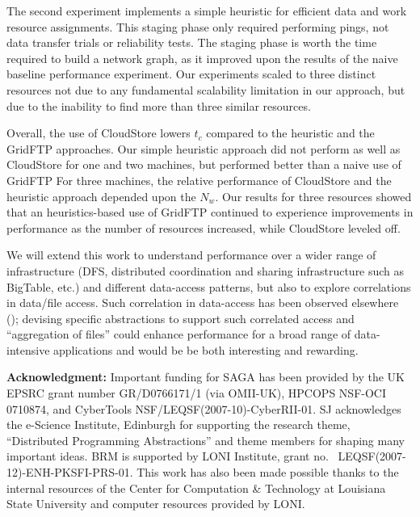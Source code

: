 \documentclass{rspublic}
\begin{document}
The second experiment implements a simple heuristic for efficient data
and work resource assignments. This staging phase only required
performing pings, not data transfer trials or reliability tests. The
staging phase is worth the time required to build a network graph, as
it improved upon the results of the naive baseline performance
experiment. Our experiments scaled to three distinct resources not due
to any fundamental scalability limitation in our approach, but due to
the inability to find more than three similar resources.
 
Overall, the use of CloudStore lowers $t_c$ compared to the
heuristic and the GridFTP approaches. Our simple heuristic 
approach did not perform as well as CloudStore for one and two
machines, but performed better than a naive use of GridFTP For three
machines, the relative performance of CloudStore and the heuristic
approach depended upon the $N_w$. Our results for three resources
showed that an heuristics-based use of GridFTP continued to experience
improvements in performance as the number of resources increased, while
CloudStore leveled off. 

We will extend this work to understand performance over a wider range
of infrastructure (DFS, distributed coordination and sharing
infrastructure such as BigTable, etc.) and different data-access
patterns, but also to explore correlations in data/file access. Such
correlation in data-access has been observed elsewhere
(\cite{filecule}); devising specific abstractions to support such
correlated access and ``aggregation of files'' could enhance
performance for a broad range of data-intensive applications and would
be be both interesting and rewarding.

{\bf Acknowledgment:} Important funding for SAGA has been provided by
the UK EPSRC grant number GR/D0766171/1 (via OMII-UK), HPCOPS
NSF-OCI 0710874, and CyberTools NSF/LEQSF(2007-10)-CyberRII-01.
 SJ acknowledges the e-Science Institute, Edinburgh
for supporting the research theme, ``Distributed Programming
Abstractions'' and theme members for shaping many important ideas. BRM
is supported by LONI Institute, grant no. \
LEQSF(2007-12)-ENH-PKSFI-PRS-01. This work has also been made possible
thanks to the internal resources of the Center for Computation \&
Technology at Louisiana State University and computer resources
provided by LONI.

\vspace{-0.4cm}


%
 

\end{document}
